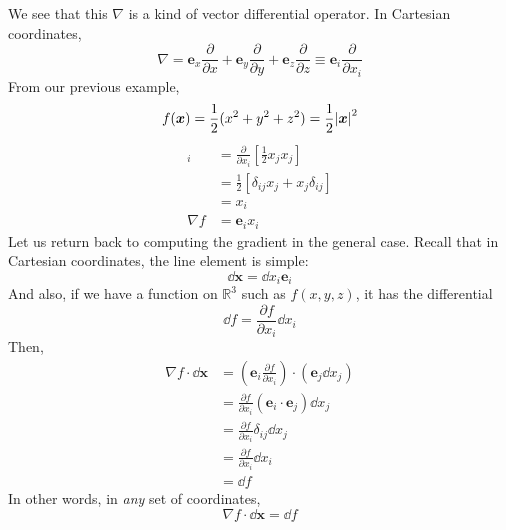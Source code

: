 \documentclass{article}
\begin{document}
We see that this $\nabla$ is a kind of vector differential operator. In Cartesian coordinates,
\[ \nabla = \bm e_x \frac{\partial}{\partial x} + \bm e_y \frac{\partial}{\partial y} + \bm e_z \frac{\partial}{\partial z} \equiv \bm e_i \frac{\partial}{\partial x_i} \]
From our previous example,
\[ f(\bm x) = \frac{1}{2}(x^2 + y^2 + z^2) = \frac{1}{2}\abs{\bm x}^2 \]
\begin{align*}
    [\nabla f]_i & = \frac{\partial}{\partial x_i}\left[ \frac{1}{2} x_j x_j \right] \\
                 & = \frac{1}{2} \left[ \delta_{ij} x_j + x_j \delta_{ij} \right]    \\
                 & = x_i                                                             \\
    \nabla f     & = \bm e_i x_i
\end{align*}
Let us return back to computing the gradient in the general case. Recall that in Cartesian coordinates, the line element is simple:
\[ \dd \bm x = \dd x_i \bm e_i \]
And also, if we have a function on $\mathbb R^3$ such as $f(x, y, z)$, it has the differential
\[ \dd f = \frac{\partial f}{\partial x_i}\dd x_i \]
Then,
\begin{align*}
    \nabla f \cdot \dd \bm x & = \left( \bm e_i \frac{\partial f}{\partial x_i} \right) \cdot \left( \bm e_j \dd x_j \right) \\
                             & = \frac{\partial f}{\partial x_i} \left( \bm e_i \cdot \bm e_j \right) \dd x_j                \\
                             & = \frac{\partial f}{\partial x_i} \delta_{ij} \dd x_j                                         \\
                             & = \frac{\partial f}{\partial x_i} \dd x_i                                                     \\
                             & = \dd f
\end{align*}
In other words, in \textit{any} set of coordinates,
\[ \nabla f \cdot \dd \bm x = \dd f \]
\end{document}

